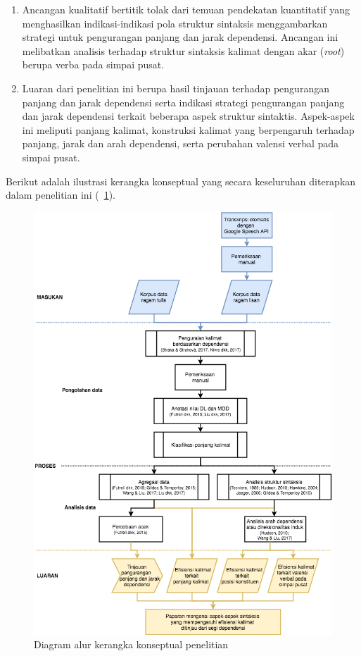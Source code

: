 \begin{enumerate}
	\item Ancangan kualitatif bertitik tolak dari temuan pendekatan kuantitatif yang menghasilkan indikasi-indikasi pola struktur sintaksis menggambarkan strategi untuk pengurangan panjang dan jarak dependensi. Ancangan ini melibatkan analisis terhadap struktur sintaksis kalimat dengan akar (\textit{root}) berupa verba pada simpai pusat. 
	\item Luaran dari penelitian ini berupa hasil tinjauan terhadap pengurangan panjang dan jarak dependensi serta indikasi strategi pengurangan panjang dan jarak dependensi terkait beberapa aspek struktur sintaktis. Aspek-aspek ini meliputi panjang kalimat, konstruksi kalimat yang berpengaruh terhadap panjang, jarak dan arah dependensi, serta perubahan valensi verbal pada simpai pusat.
\end{enumerate}

\newpage
Berikut adalah ilustrasi kerangka konseptual yang secara keseluruhan diterapkan dalam penelitian ini (\pic~\ref{fig:kerangka-konseptual}). 
\begin{figure}
	\centering \includegraphics[width=1
	\textwidth] {pics/kerangka-konseptual.png} \caption{Diagram alur kerangka konseptual penelitian} 
\label{fig:kerangka-konseptual} \end{figure}

